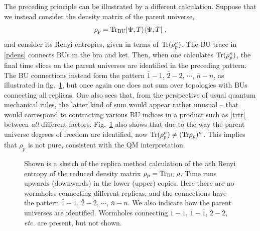 \documentclass[12pt]{article}
\numberwithin{equation}{section}
\newcommand{\beq}{\begin{equation}}
\newcommand{\eeq}{\end{equation}}
\newcommand{\Tr}{{\rm Tr}}
\begin{document}
The preceding principle can be illustrated by a different calculation.  Suppose that we instead consider the density matrix of the parent universe,
\beq\label{pdens}
\rho_p = \Tr_{\rm BU} |\Psi, T\rangle \langle\Psi, T|\ ,
\eeq
and consider its Renyi entropies, given in terms of $\Tr(\rho_p^n)$.  The BU trace in \eqref{pdens} connects BUs in the bra and ket.  Then, when one calculates $\Tr(\rho_p^n)$, the final time slices on the parent universes are identified in the preceding pattern.  The BU connections instead form the pattern ${\bar 1}-1$, ${\bar 2}-2$, $\cdots$, ${\bar n} - n$, as illustrated in fig.~\ref{fig:whrep2}, 
but once again one does not sum over topologies with BUs connecting all replicas.  One also sees that, from the perspective of usual quantum mechanical rules, the latter kind of sum would appear rather unusual -- that would correspond to contracting various BU indices in a product such as \eqref{trtr} between {\it all} different factors. Fig.~\ref{fig:whrep2} also shows that due to the way the parent universe degrees of freedom are identified, now ${\rm Tr}(\rho_p^n)\neq({\rm Tr} \rho_p)^n$. This implies that $\rho_p$ is not pure, consistent with the QM interpretation. 
\begin{figure}[t!]
\begin{center}
 \caption{\label{fig:whrep2}Shown is a sketch of the replica method calculation of the $n$th Renyi entropy of the reduced density matrix $\rho_p = {\rm Tr}_{\rm BU} \,\rho$. Time runs upwards (downwards) in the lower (upper) copies. Here there are no wormholes connecting different replicas, and the connections have the pattern ${\bar 1}-1$, ${\bar 2}-2$, $\cdots$, ${\bar n} - n$.  We also indicate how the parent universes are identified. Wormholes connecting $1-1$, $\bar{1}-\bar{1}$, $2-2$, {\it etc.} are present, but not shown.}
\end{center}
\end{figure}
\end{document}
